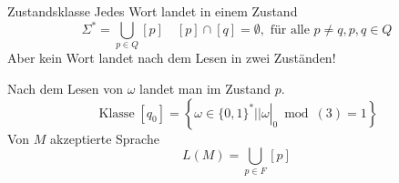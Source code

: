\begin{definition}{Zustandsklasse}
    Jedes Wort landet in einem Zustand
    $$
    \Sigma^{*}=\bigcup_{p \in Q}[p] \quad [p] \cap[q]=\emptyset, \text { für alle } p \neq q, p, q \in Q
    $$
    Aber kein Wort landet nach dem Lesen in zwei Zuständen!
\end{definition}

\begin{example}
    Nach dem Lesen von $\omega$ landet man im Zustand $p$.
    $$
    \operatorname{Klasse}\left[q_{0}\right]=\left\{\left.\omega \in\{0,1\}^{*}|| \omega\right|_{0} \bmod (3)=1\right\}
    $$
    Von $M$ akzeptierte Sprache
    $$
    L(M)=\bigcup_{p \in F}[p]
    $$
\end{example}